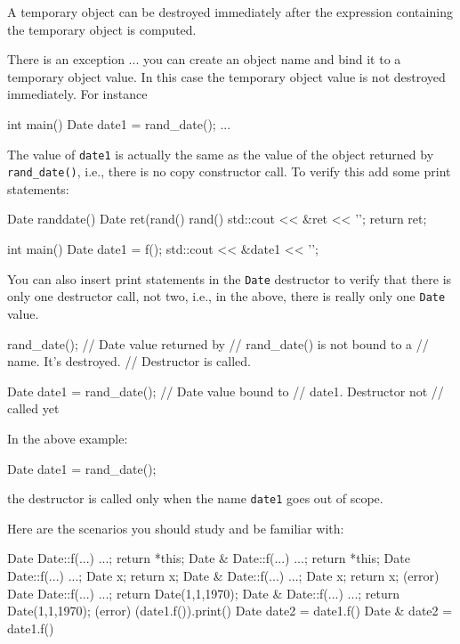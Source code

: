 A temporary object can be destroyed immediately after the expression
containing the temporary object is computed.

There is an exception ... you can create an object name and bind it
to a temporary object value. In this case the temporary object value is
not destroyed immediately. For instance

\begin{consolethree}[escapeinside=||]
int main()
{
    Date date1 = rand_date();
    ...
}
\end{consolethree}

The value of \texttt{date1} is actually the same as the value of the
object returned by \texttt{rand\_date()}, i.e., there is no copy
constructor call. To verify this add some print statements:

\begin{consolethree}[escapeinside=||]
Date randdate()
{
    Date ret(rand() %
             rand() %
    std::cout << &ret << '\n';
    return ret;
}

int main()
{
    Date date1 = f();
    std::cout << &date1 << '\n';
}
\end{consolethree}

You can also insert print statements in the \texttt{Date} destructor to
verify that there is only one destructor call, not two, i.e., in the
above, there is really only one \texttt{Date} value.

\begin{consolethree}[escapeinside=||]
rand_date(); // Date value returned by
             // rand_date() is not bound to a
             // name. It's destroyed.
             // Destructor is called.

Date date1 = rand_date(); // Date value bound to
                          // date1. Destructor not
                          // called yet
\end{consolethree}

In the above example:

\begin{consolethree}[escapeinside=||]
Date date1 = rand_date();
\end{consolethree}

the destructor is called only when the name \texttt{date1} goes out of
scope.

Here are the scenarios you should study and be familiar with:

\begin{consolethree}[escapeinside=||]
Date Date::f(...) { ...; return *this; }
Date & Date::f(...) { ...; return *this; }
Date Date::f(...) { ...; Date x; return x; }
Date & Date::f(...) { ...; Date x; return x; } (error)
Date Date::f(...) { ...; return Date(1,1,1970); }
Date & Date::f(...) { ...; return Date(1,1,1970); } (error)
(date1.f()).print()
Date date2 = date1.f()
Date & date2 = date1.f()
\end{consolethree}


